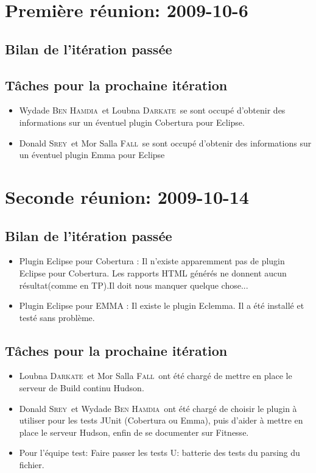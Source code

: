 \documentclass[a4paper,12pt]{article}
\def\familyname{\textsc}
\def\firstname#1{#1}
\def\groupmember#1#2{\firstname{#1} \familyname{#2}}
\def\mwyd{\groupmember{Wydade}{Ben Hamdia}}
\def\mlou{\groupmember{Loubna}{Darkate}}
\def\mmor{\groupmember{Mor Salla}{Fall}}
\def\mdon{\groupmember{Donald}{Srey}}
\begin{document}
\section{Première réunion: 2009-10-6}

\subsection{Bilan de l'itération passée}

\subsection{Tâches pour la prochaine itération}

\begin{itemize}
 \item \mwyd\ et \mlou\ se sont occupé d'obtenir des informations sur un éventuel plugin Cobertura pour Eclipse.
 \item \mdon\ et \mmor\ se sont occupé d'obtenir des informations sur un éventuel plugin Emma pour Eclipse
\end{itemize}



\section{Seconde réunion: 2009-10-14}

\subsection{Bilan de l'itération passée}
\begin{itemize}
 \item Plugin Eclipse pour Cobertura :
 Il n'existe apparemment pas de plugin Eclipse pour Cobertura. Les rapports HTML générés ne donnent aucun résultat(comme en TP).Il doit nous manquer quelque chose...

\item Plugin Eclipse pour EMMA :
 Il existe le plugin Eclemma. Il a été installé et testé sans problème.
\end{itemize}

\subsection{Tâches pour la prochaine itération}

\begin{itemize}
 \item \mlou\ et \mmor\ ont été chargé de mettre en place le serveur de Build continu Hudson.
 \item \mdon\ et \mwyd\ ont été chargé de choisir le plugin à utiliser pour les tests JUnit (Cobertura ou Emma), puis d'aider à mettre en place le serveur Hudson, enfin de se documenter sur Fitnesse.
 \item Pour l'équipe test: Faire passer les tests U: batterie des tests du parsing du fichier.

\end{itemize}
\end{document}
